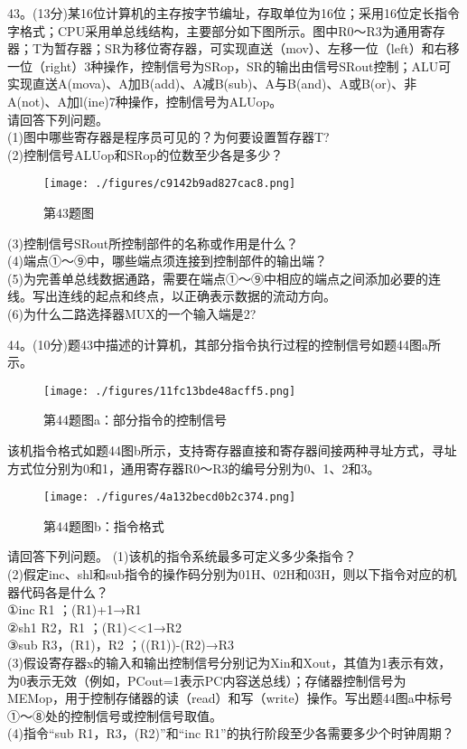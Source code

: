 43。(13分)某16位计算机的主存按字节编址，存取单位为16位；采用16位定长指令字格式；CPU采用单总线结构，主要部分如下图所示。图中R0～R3为通用寄存器；T为暂存器；SR为移位寄存器，可实现直送（mov）、左移一位（left）和右移一位（right）3种操作，控制信号为SRop，SR的输出由信号SRout控制；ALU可实现直送A(mova)、A加B(add)、A减B(sub)、A与B(and)、A或B(or)、非A(not)、A加l(ine)7种操作，控制信号为ALUop。 \\
请回答下列问题。 \\
(1)图中哪些寄存器是程序员可见的？为何要设置暂存器T? \\
(2)控制信号ALUop和SRop的位数至少各是多少？
\begin{figure}[ht]
\centering
\texttt{[image: ./figures/c9142b9ad827cac8.png]}
\caption{第43题图} \label{fig_CSN15_6}
\end{figure}
(3)控制信号SRout所控制部件的名称或作用是什么？ \\
(4)端点①～⑨中，哪些端点须连接到控制部件的输出端？ \\
(5)为完善单总线数据通路，需要在端点①～⑨中相应的端点之间添加必要的连线。写出连线的起点和终点，以正确表示数据的流动方向。 \\
(6)为什么二路选择器MUX的一个输入端是2?

44。(10分)题43中描述的计算机，其部分指令执行过程的控制信号如题44图a所示。
\begin{figure}[ht]
\centering
\texttt{[image: ./figures/11fc13bde48acff5.png]}
\caption{第44题图a：部分指令的控制信号} \label{fig_CSN15_7}
\end{figure}
该机指令格式如题44图b所示，支持寄存器直接和寄存器间接两种寻址方式，寻址方式位分别为0和1，通用寄存器R0～R3的编号分别为0、1、2和3。
\begin{figure}[ht]
\centering
\texttt{[image: ./figures/4a132becd0b2c374.png]}
\caption{第44题图b：指令格式} \label{fig_CSN15_8}
\end{figure}
请回答下列问题。
(1)该机的指令系统最多可定义多少条指令？ \\
(2)假定inc、shl和sub指令的操作码分别为01H、02H和03H，则以下指令对应的机器代码各是什么？ \\
①inc R1 ；(R1)+1→R1 \\
②sh1 R2，R1 ；(R1)<<1→R2 \\
③sub R3，(R1)，R2 ；((R1))-(R2)→R3 \\
(3)假设寄存器x的输入和输出控制信号分别记为Xin和Xout，其值为1表示有效，为0表示无效（例如，PCout=1表示PC内容送总线）；存储器控制信号为MEMop，用于控制存储器的读（read）和写（write）操作。写出题44图a中标号①～⑧处的控制信号或控制信号取值。 \\
(4)指令“sub R1，R3，(R2)”和“inc R1”的执行阶段至少各需要多少个时钟周期？

